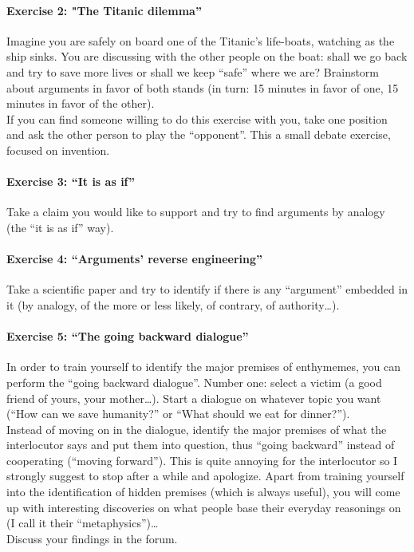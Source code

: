 \documentclass{article}
\begin{document}
\paragraph{Exercise 2: "The Titanic dilemma”}
Imagine you are safely on board one of the Titanic’s life-boats, watching as the ship sinks. You are discussing with the other people on the boat: shall we go back and try to save more lives or shall we keep “safe” where we are? Brainstorm about arguments in favor of both stands (in turn: 15 minutes in favor of one, 15 minutes in favor of the other).\\
If you can find someone willing to do this exercise with you, take one position and ask the other person to play the “opponent”. This a small debate exercise, focused on invention.
\paragraph{Exercise 3: “It is as if”}
Take a claim you would like to support and try to find arguments by analogy (the “it is as if” way).
\paragraph{Exercise 4: “Arguments’ reverse engineering”}
Take a scientific paper and try to identify if there is any “argument” embedded in it (by analogy, of the more or less likely, of contrary, of authority…).
\paragraph{Exercise 5: “The going backward dialogue”}
In order to train yourself to identify the major premises of enthymemes, you can perform the “going backward dialogue”. Number one: select a victim (a good friend of yours, your mother…). Start a dialogue on whatever topic you want (“How can we save humanity?” or “What should we eat for dinner?”).\\
Instead of moving on in the dialogue, identify the major premises of what the interlocutor says and put them into question, thus “going backward” instead of cooperating (“moving forward”). This is quite annoying for the interlocutor so I strongly suggest to stop after a while and apologize. Apart from training yourself into the identification of hidden premises (which is always useful), you will come up with interesting discoveries on what people base their everyday reasonings on (I call it their “metaphysics”)…\\
Discuss your findings in the forum.
\end{document}

